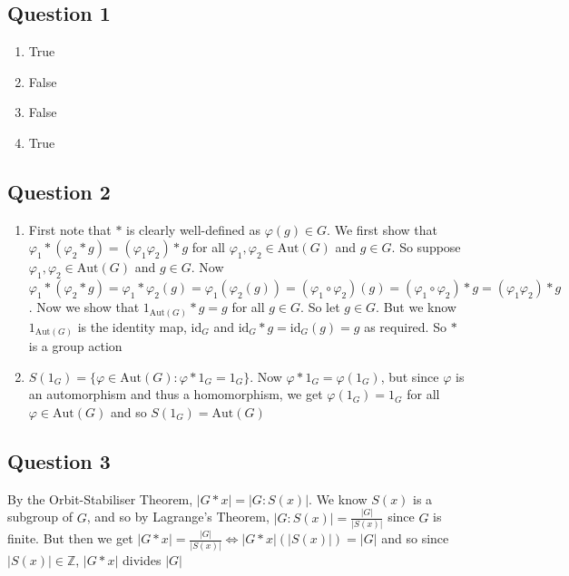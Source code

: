 \documentclass[letterpaper, 11pt]{article}
\newcommand{\Z}{\mathbb{Z}}   %
\newcommand{\1}{\mathds{1}}	%
\theoremstyle{definition}
\begin{document}
\subsection*{Question 1}
\begin{enumerate}[label=(\alph*)]
\item True
\item False
\item False
\item True
\end{enumerate}

\subsection*{Question 2}
\begin{enumerate}[label=(\alph*)]
\item First note that $*$ is clearly well-defined as $\varphi (g) \in G$. We first show that $\varphi _1 * (\varphi_2 * g) = (\varphi_1 \varphi_2) * g$ for all $\varphi_1, \varphi_2 \in \text{Aut}(G)$ and $g \in G$. So suppose $\varphi_1, \varphi_2 \in \text{Aut}(G)$ and $g \in G$. Now $\varphi _1 * (\varphi_2 * g) = \varphi _1 * \varphi _2 (g) = \varphi _1 (\varphi _2 (g)) = (\varphi _1 \circ \varphi _2)(g) = (\varphi _1 \circ \varphi _2) * g = (\varphi _1 \varphi _2) * g$. Now we show that $1_{\text{Aut}(G)} * g = g$ for all $g \in G$. So let $g \in G$. But we know $1_{\text{Aut}(G)} $ is the identity map, $\text{id}_G$ and $\text{id}_G * g = \text{id}_G(g) = g$ as required. So $*$ is a group action

\item $S(1_G) = \{\varphi \in \text{Aut}(G) : \varphi * 1_G = 1_G\}$. Now $\varphi * 1_G = \varphi (1_G)$, but since $\varphi$ is an automorphism and thus a homomorphism, we get $\varphi (1_G) = 1_G$ for all $\varphi \in \text{Aut}(G)$ and so $S(1_G) = \text{Aut}(G)$
\end{enumerate}

\subsection*{Question 3}
By the Orbit-Stabiliser Theorem, $|G*x| = |G : S(x)|$. We know $S(x)$ is a subgroup of $G$, and so by Lagrange's Theorem, $|G:S(x)| = \frac{|G|}{|S(x)|}$ since $G$ is finite. But then we get $|G*x| =  \frac{|G|}{|S(x)|} \iff |G*x| (|S(x)|) = |G| $ and so since $|S(x)| \in \Z$, $|G*x|$ divides $|G|$
\end{document}
